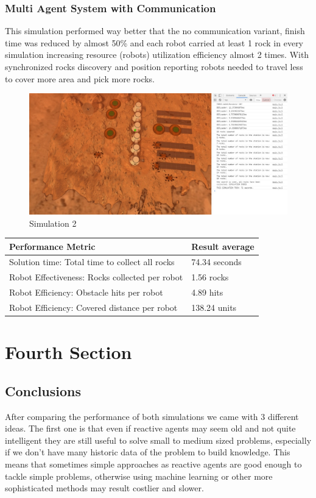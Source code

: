 \documentclass[runningheads]{llncs}
\begin{document}
\subsubsection{Multi Agent System with Communication} 
This simulation performed way better that the no communication variant, finish time was reduced by almost 50\% and each robot carried at least 1 rock in every simulation increasing resource (robots) utilization efficiency almost 2 times. With synchronized rocks discovery and position reporting robots needed to travel less to cover more area and pick more rocks.


\begin{figure}[htp]
\centering
\includegraphics[width=\textwidth,height=\textheight,keepaspectratio]{result2.jpeg}
\caption{Simulation 2}
\label{Final state screenshot of the simulation}
\end{figure}

\begin{center}
\begin{tabularx}{\textwidth}{X|l}
  \textbf{Performance Metric} & \textbf{Result average} \\
\hline
Solution time: Total time to collect all rocks & 74.34 seconds\\
Robot Effectiveness: Rocks collected per robot & 1.56 rocks\\
Robot Efficiency: Obstacle hits per robot & 4.89 hits\\
Robot Efficiency: Covered distance per robot & 138.24 units\\
\end{tabularx}
\end{center}


\section{Fourth Section}
\subsection{Conclusions}
After comparing the performance of both simulations we came with 3 different ideas. The first one is that even if reactive agents may seem old and not quite intelligent they are still useful to solve small to medium sized problems, especially if we don't have many historic data of the problem to build knowledge. This means that sometimes simple approaches as reactive agents are good enough to tackle simple problems, otherwise using machine learning or other more sophisticated methods may result costlier and slower.
\end{document}
